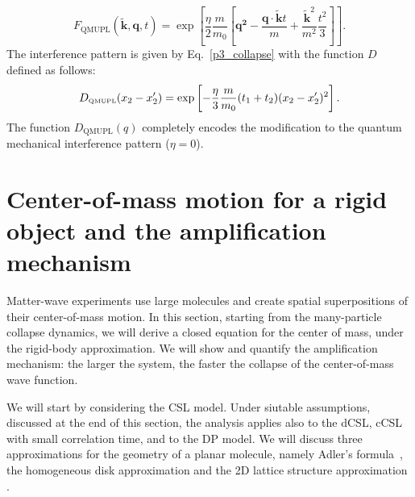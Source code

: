 \documentclass[12pt,groupedaddress,pra,aps]{revtex4-1}
\begin{document}
\begin{equation}
F_{\text{QMUPL}}(\bm{\tilde{k}},\bm{q},t)=\exp\left[\frac{\eta}{2}\frac{m}{m_{0}}\left[\mathbf{q^{2}}-\frac{\mathbf{q}\cdot\tilde{\mathbf{k}}t}{m}+\frac{\tilde{\mathbf{k}}^{2}}{m^{2}}\frac{t^{2}}{3}\right]\right].
\end{equation}
The interference pattern is given by Eq.~\eqref{p3_collapse} with
the function $D$ defined as follows: 
\begin{equation}
D_{\text{\tiny QMUPL}}(x_{2}-x_{2}')=\exp\left[-\frac{\eta}{3}\frac{m}{m_{0}}(t_{1}+t_{2})(x_{2}-x_{2}')^{2}\right].\label{cfunc-1}
\end{equation}
The function $D_{\text{QMUPL}}(q)$ completely encodes the modification
to the quantum mechanical interference pattern ($\eta=0$). 


\clearpage
\section{Center-of-mass motion for a rigid object and the amplification mechanism}\label{sec_amp}
Matter-wave experiments use large molecules and create spatial superpositions of their center-of-mass motion. In this section, starting from the many-particle collapse dynamics, we will derive a closed equation for the center of mass, under the rigid-body approximation. We will show and quantify the amplification mechanism: the larger the system, the faster the collapse of the center-of-mass wave function.

We will start by considering the CSL model. Under siutable assumptions, discussed at the end of this section, the analysis  applies also to the dCSL,  cCSL with small correlation time, and to the DP model. We will discuss three approximations for the geometry of a planar molecule, namely Adler's formula~\cite{1751-8121-40-12-S03}, the homogeneous disk approximation and the 2D lattice structure approximation \cite{PhysRevLett.113.020405}. 
\end{document}
